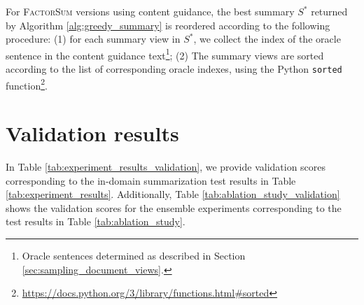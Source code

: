 \documentclass[11pt,table]{article}
\newcommand{\modelname}{FactorSum}
\begin{document}
For \textsc{\modelname} versions using content guidance, the best summary $S^*$ returned by Algorithm \ref{alg:greedy_summary} is reordered according to the following procedure: (1) for each summary view in $S^*$, we collect the index of the oracle sentence in the content guidance text\footnote{Oracle sentences determined as described in Section \ref{sec:sampling_document_views}.}; (2) The summary views are sorted according to the list of corresponding oracle indexes, using the Python \texttt{sorted} function\footnote{\url{https://docs.python.org/3/library/functions.html\#sorted}}.

\section{Validation results}
\label{sec:validation_results}

In Table \ref{tab:experiment_results_validation}, we provide validation scores corresponding to the in-domain summarization test results in Table \ref{tab:experiment_results}. Additionally, Table \ref{tab:ablation_study_validation} shows the validation scores for the ensemble experiments corresponding to the test results in Table \ref{tab:ablation_study}. 
\end{document}

